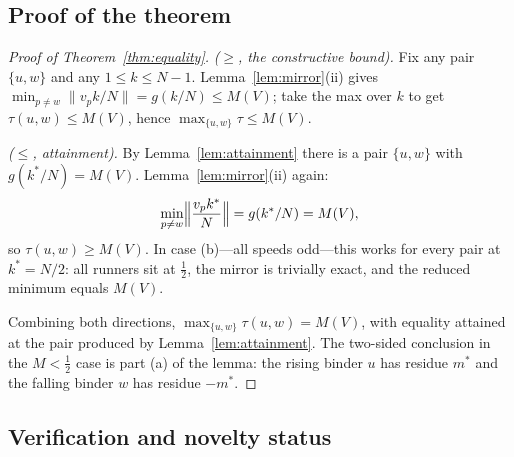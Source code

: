 \documentclass[11pt,a4paper]{article}
\numberwithin{equation}{section}
\theoremstyle{plain}
\theoremstyle{definition}
\theoremstyle{remark}
\begin{document}
\subsection{Proof of the theorem}

\begin{proof}[Proof of Theorem~\ref{thm:equality}]
\emph{($\ge$, the constructive bound).} Fix any pair $\{u,w\}$ and any
$1\le k\le N-1$. Lemma~\ref{lem:mirror}(ii) gives
$\min_{p\ne w}\lVert v_p k/N\rVert=g(k/N)\le M(V)$; take the max over
$k$ to get $\tau(u,w)\le M(V)$, hence
$\max_{\{u,w\}}\tau\le M(V)$.

\emph{($\le$, attainment).} By Lemma~\ref{lem:attainment} there is a pair
$\{u,w\}$ with $g(k^\ast/N)=M(V)$. Lemma~\ref{lem:mirror}(ii) again:
\[
\min_{p\ne w}\Bigl\lVert \frac{v_p k^\ast}{N}\Bigr\rVert
=g(k^\ast/N)=M(V),
\]
so $\tau(u,w)\ge M(V)$. In case (b)---all speeds odd---this works for
every pair at $k^\ast=N/2$: all runners sit at $\tfrac12$, the mirror is
trivially exact, and the reduced minimum equals $M(V)$.

Combining both directions, $\max_{\{u,w\}}\tau(u,w)=M(V)$, with equality
attained at the pair produced by Lemma~\ref{lem:attainment}. The
two-sided conclusion in the $M<\tfrac12$ case is part (a) of the lemma:
the rising binder $u$ has residue $m^\ast$ and the falling binder $w$ has
residue $-m^\ast$.
\end{proof}

\subsection{Verification and novelty status}\label{sec:equality-verify}
\end{document}
